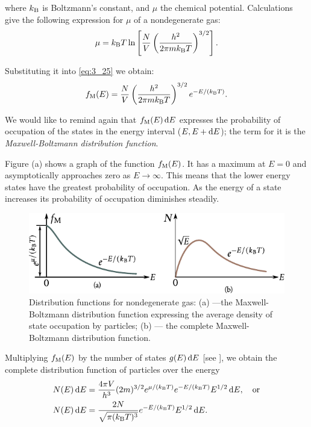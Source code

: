 \noindent
where $k_{\text{B}}$ is Boltzmann's constant, and $\mu$ the chemical potential. Calculations give the following expression for $\mu$ of a nondegenerate gas:
\begin{equation}\label{eq:3_26}
    \mu = k_{\text{B}} T \ln\left[\frac{N}{V} \left(\frac{h^2}{2\pi m k_{\text{B}} T}\right)^{3/2}\right].
\end{equation}

Substituting it into \eqref{eq:3_25} we obtain:
\begin{equation}\label{eq:3_27}
    f_{\text{M}}(E) = \frac{N}{V} \left(\frac{h^2}{2\pi m k_{\text{B}} T}\right)^{3/2} e^{-E/(k_{\text{B}} T)}.
\end{equation}

\noindent
We would like to remind again that $f_{\text{M}}(E)\,\mathrm{d} E$ expresses the probability of occupation of the states in the energy interval ($E, E+\mathrm{d} E$); the term for it is the \textit{Maxwell-Boltzmann distribution function}.

Figure (a) shows a graph of the function $f_{\text{M}}(E)$. It has a maximum at $E=0$ and asymptotically approaches zero as $E\to\infty$. This means that the lower energy states have the greatest probability of occupation. As the energy of a state increases its probability of occupation diminishes steadily.

\begin{figure}[t]
	\begin{center}
		\includegraphics[scale=0.95]{figures/ch_03/fig_3_3.pdf}
		\caption[]{Distribution functions for nondegenerate gas: (a) ---the Maxwell-Boltzmann distribution function expressing the average density of state occupation by particles; (b) --- the complete Maxwell-Boltzmann distribution function.}
		\label{fig:3_3}
	\end{center}
	\vspace{-0.7cm}
\end{figure}

Multiplying $f_{\text{M}}(E)$ by the number of states $g(E)\,\mathrm{d} E$ [see ], we obtain the complete distribution function of particles over the energy
\begin{equation}\label{eq:3_28}
    \begin{split}
    N(E)\, \mathrm{d} E &= \frac{4\pi V}{h^3} (2m)^{3/2} e^{\mu/(k_{\text{B}} T)} e^{-E/(k_{\text{B}} T)} E^{1/2}\, \mathrm{d} E,\quad \text{or}\\
    N(E)\, \mathrm{d} E &= \frac{2N}{\sqrt{\pi(k_{\text{B}} T)^3}} e^{-E/(k_{\text{B}} T)} E^{1/2}\, \mathrm{d} E.
    \end{split}
\end{equation}

